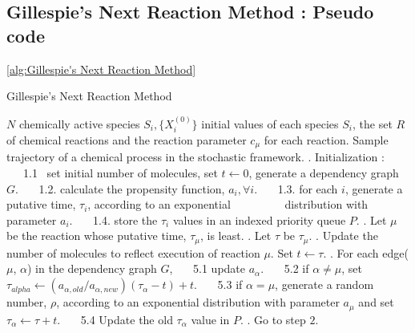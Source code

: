 \documentclass[11pt,a4paper]{article}
\begin{document}
\subsection{Gillespie's Next Reaction Method : Pseudo code} \ref{alg:Gillespie's Next Reaction Method}
\begin{algorithm}[!h]                            %
\caption{Gillespie's Next Reaction Method}       %
\begin{algorithmic}                              %
\REQUIRE $N$ chemically active species $S_i, \{X_{i}^{(0)}\}$ initial values of each species $S_i$, the set $R$ of \hspace*{8mm} chemical reactions and the reaction parameter $c_{\mu}$ for each reaction.
\ENSURE Sample trajectory of a chemical process in the stochastic framework.
    . Initialization :
      \STATE \ \ \ 1.1  \ set initial number of molecules, set $t \leftarrow 0$, generate a dependency graph $G$.
      \STATE \ \ \ 1.2. calculate the propensity function, $a_{i} ,  \forall i$.
      \STATE \ \ \ 1.3. for each $i$, generate a putative time, $\tau_{i}$, according to an exponential
      \STATE \ \ \ \ \ \ \ \ \ distribution with parameter $a_{i}$.
      \STATE \ \ \ 1.4. store the $\tau_{i}$ values in an indexed priority queue $P.$
    . Let $\mu$ be the reaction whose putative time, $\tau_{\mu}$, is least.
    . Let $\tau$ be $\tau_{\mu}$.
    . Update the number of molecules to reflect execution of reaction $\mu$. Set $t \leftarrow \tau$.
    . For each edge($\mu$, $\alpha$) in the dependency graph $G$,
    \STATE \ \ \ 5.1 update $a_{\alpha}.$
    \STATE \ \ \ 5.2 if $\alpha \neq \mu$, set $\tau_{alpha} \leftarrow (a_{\alpha,old}/a_{\alpha, new})(\tau_{\alpha} - t) + t.$
    \STATE \ \ \ 5.3 if $\alpha = \mu$, generate a random number, $\rho$, according to an exponential distribution \hspace*{8mm} with parameter $a_{\mu}$ and set $\tau_{\alpha} \leftarrow \tau + t.$
    \STATE \ \ \ 5.4 Update the old $\tau_{\alpha}$ value in $P$.
    . Go to step $2$.
\ENDWHILE
\end{algorithmic}
\label{alg:Gillespie's Next Reaction Method}
\end{algorithm}
\end{document}
